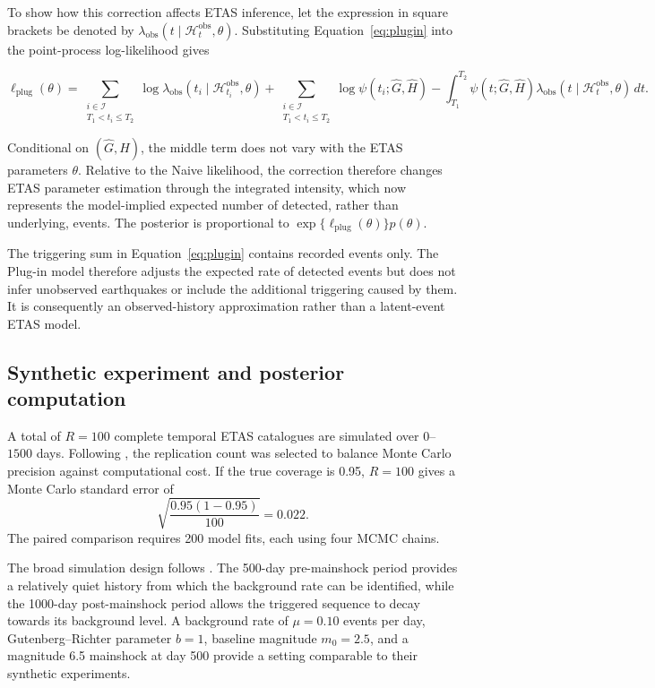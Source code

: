 \documentclass{statsmsc}
\begin{document}
To show how this correction affects ETAS inference, let the expression in
square brackets be denoted by
\(\lambda_{\mathrm{obs}}(t\mid\mathcal H_t^{\mathrm{obs}},\theta)\).
Substituting Equation~\eqref{eq:plugin} into the point-process log-likelihood
gives

\[
\ell_{\mathrm{plug}}(\theta)
=
\sum_{\substack{i\in\mathcal I\\T_1<t_i\leq T_2}}
\log\lambda_{\mathrm{obs}}
(t_i\mid\mathcal H_{t_i}^{\mathrm{obs}},\theta)
+
\sum_{\substack{i\in\mathcal I\\T_1<t_i\leq T_2}}
\log\psi(t_i;\widehat G,\widehat H)
-
\int_{T_1}^{T_2}
\psi(t;\widehat G,\widehat H)
\lambda_{\mathrm{obs}}
(t\mid\mathcal H_t^{\mathrm{obs}},\theta)\,dt.
\]

Conditional on \((\widehat G,\widehat H)\), the middle term does not vary with
the ETAS parameters \(\theta\). Relative to the Naive likelihood, the
correction therefore changes ETAS parameter estimation through the integrated
intensity, which now represents the model-implied expected number of detected,
rather than underlying, events. The posterior is proportional to
\(\exp\{\ell_{\mathrm{plug}}(\theta)\}p(\theta)\).

The triggering sum in Equation~\eqref{eq:plugin} contains recorded events
only. The Plug-in model therefore adjusts the expected rate of detected events
but does not infer unobserved earthquakes or include the additional triggering
caused by them. It is consequently an observed-history approximation rather
than a latent-event ETAS model.

\subsection{Synthetic experiment and posterior computation}
\label{subsec:simulation_design}

A total of \(R=100\) complete temporal ETAS catalogues are simulated over
\(0\)--\(1500\) days. Following \citet{morris2019}, the replication count was
selected to balance Monte Carlo precision against computational cost. If the
true coverage is 0.95, \(R=100\) gives a Monte Carlo standard error of
\[
\sqrt{\frac{0.95(1-0.95)}{100}}
=
0.022.
\]
The paired comparison requires 200 model fits, each using four MCMC chains.

The broad simulation design follows \citet{kamranzad2025}. The 500-day
pre-mainshock period provides a relatively quiet history from which the
background rate can be identified, while the 1000-day post-mainshock period
allows the triggered sequence to decay towards its background level. A
background rate of \(\mu=0.10\) events per day, Gutenberg--Richter parameter
\(b=1\), baseline magnitude \(m_0=2.5\), and a magnitude 6.5 mainshock at
day 500 provide a setting comparable to their synthetic experiments.
\end{document}
